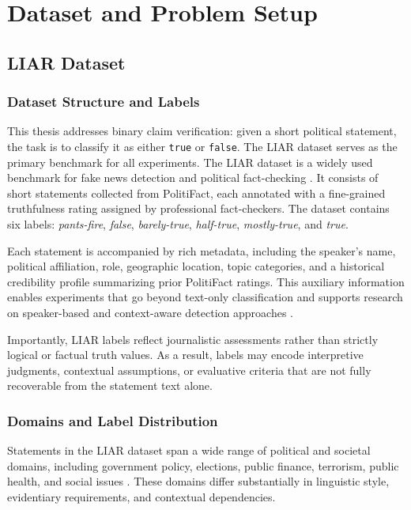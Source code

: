 \chapter{Dataset and Problem Setup}

\section{LIAR Dataset}
\subsection{Dataset Structure and Labels}

This thesis addresses binary claim verification: given a short political statement, the task is to classify it as either \texttt{true} or \texttt{false}. The LIAR dataset serves as the primary benchmark for all experiments.
The LIAR dataset is a widely used benchmark for fake news detection and political fact-checking \cite{wang2017liarliarpantsfire}. It consists of short statements collected from PolitiFact, each annotated with a fine-grained truthfulness rating assigned by professional fact-checkers. The dataset contains six labels: \textit{pants-fire}, \textit{false}, \textit{barely-true}, \textit{half-true}, \textit{mostly-true}, and \textit{true}.

Each statement is accompanied by rich metadata, including the speaker’s name, political affiliation, role, geographic location, topic categories, and a historical credibility profile summarizing prior PolitiFact ratings. This auxiliary information enables experiments that go beyond text-only classification and supports research on speaker-based and context-aware detection approaches \cite{wang2017liarliarpantsfire}.

Importantly, LIAR labels reflect journalistic assessments rather than strictly logical or factual truth values. As a result, labels may encode interpretive judgments, contextual assumptions, or evaluative criteria that are not fully recoverable from the statement text alone.

\subsection{Domains and Label Distribution}

Statements in the LIAR dataset span a wide range of political and societal domains, including government policy, elections, public finance, terrorism, public health, and social issues \cite{wang2017liarliarpantsfire}. These domains differ substantially in linguistic style, evidentiary requirements, and contextual dependencies.

